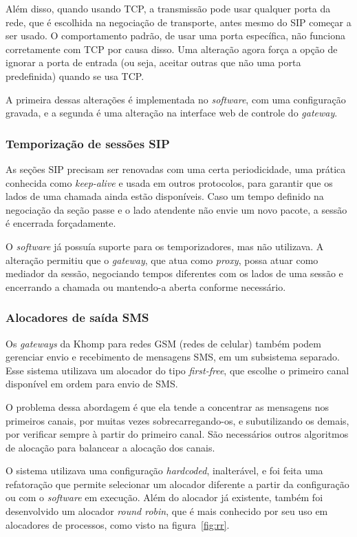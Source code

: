 \documentclass[12pt]{article}
\begin{document}
Além disso, quando usando TCP, a transmissão pode usar qualquer porta da rede,
que é escolhida na negociação de transporte, antes mesmo do SIP começar a ser
usado. O comportamento padrão, de usar uma porta específica, não funciona
corretamente com TCP por causa disso. Uma alteração agora força a opção de
ignorar a porta de entrada (ou seja, aceitar outras que não uma porta
predefinida) quando se usa TCP.

A primeira dessas alterações é implementada no \textit{software}, com uma
configuração gravada, e a segunda é uma alteração na interface web de controle
do \textit{gateway}.

\subsubsection{Temporização de sessões SIP}

As seções SIP precisam ser renovadas com uma certa periodicidade, uma prática
conhecida como \textit{keep-alive} e usada em outros protocolos, para garantir
que os lados de uma chamada ainda estão disponíveis. Caso um tempo definido na
negociação da seção passe e o lado atendente não envie um novo pacote, a
sessão é encerrada forçadamente.

O \textit{software} já possuía suporte para os temporizadores, mas não
utilizava. A alteração permitiu que o \textit{gateway}, que atua como
\textit{proxy}, possa atuar como mediador da sessão, negociando tempos
diferentes com os lados de uma sessão e encerrando a chamada ou mantendo-a
aberta conforme necessário.

\subsubsection{Alocadores de saída SMS}

Os \textit{gateways} da Khomp para redes GSM (redes de celular) também podem
gerenciar envio e recebimento de mensagens SMS, em um subsistema separado. Esse
sistema utilizava um alocador do tipo \textit{first-free}, que escolhe o
primeiro canal disponível em ordem para envio de SMS.

O problema dessa abordagem é que ela tende a concentrar as mensagens nos
primeiros canais, por muitas vezes sobrecarregando-os, e subutilizando os
demais, por verificar sempre à partir do primeiro canal. São necessários outros
algoritmos de alocação para balancear a alocação dos canais.

O sistema utilizava uma configuração \textit{hardcoded}, inalterável, e foi
feita uma refatoração que permite selecionar um alocador diferente a partir da
configuração ou com o \textit{software} em execução. Além do alocador já
existente, também foi desenvolvido um alocador \textit{round robin}, que é mais
conhecido por seu uso em alocadores de processos, como visto na
figura~\ref{fig:rr}.
\end{document}
